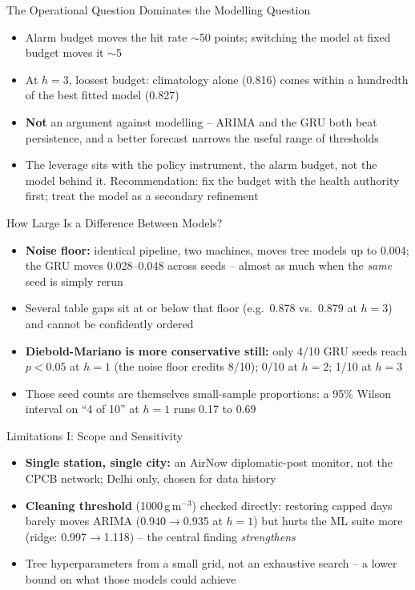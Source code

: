 \documentclass[12pt,aspectratio=169]{beamer}
\begin{document}
\begin{frame}{The Operational Question Dominates the Modelling Question}
  \begin{itemize}
    \item Alarm budget moves the hit rate $\sim$50 points; switching the
      model at fixed budget moves it $\sim$5
    \item At $h=3$, loosest budget: climatology alone (0.816) comes
      within a hundredth of the best fitted model (0.827)
    \item \textbf{Not} an argument against modelling -- ARIMA and the GRU
      both beat persistence, and a better forecast narrows the useful
      range of thresholds
    \item The leverage sits with the policy instrument, the alarm budget,
      not the model behind it. Recommendation: fix the budget with the
      health authority first; treat the model as a secondary refinement
  \end{itemize}
\end{frame}

\begin{frame}{How Large Is a Difference Between Models?}
  \begin{itemize}
    \item \textbf{Noise floor:} identical pipeline, two machines, moves
      tree models up to 0.004; the GRU moves 0.028--0.048 across seeds --
      almost as much when the \emph{same} seed is simply rerun
    \item Several table gaps sit at or below that floor (e.g.\ 0.878
      vs.\ 0.879 at $h=3$) and cannot be confidently ordered
    \item \textbf{Diebold-Mariano is more conservative still:} only 4/10
      GRU seeds reach $p<0.05$ at $h=1$ (the noise floor credits 8/10);
      0/10 at $h=2$; 1/10 at $h=3$
    \item Those seed counts are themselves small-sample proportions: a
      95\% Wilson interval on ``4 of 10'' at $h=1$ runs 0.17 to 0.69
  \end{itemize}
\end{frame}

\begin{frame}{Limitations I: Scope and Sensitivity}
  \begin{itemize}
    \item \textbf{Single station, single city:} an AirNow diplomatic-post
      monitor, not the CPCB network; Delhi only, chosen for data history
    \item \textbf{Cleaning threshold} (1000\,\textmu g\,m$^{-3}$) checked
      directly: restoring capped days barely moves ARIMA (0.940$\to$0.935
      at $h=1$) but hurts the ML suite more (ridge: 0.997$\to$1.118) --
      the central finding \emph{strengthens}
    \item Tree hyperparameters from a small grid, not an exhaustive
      search -- a lower bound on what those models could achieve
  \end{itemize}
\end{frame}
\end{document}
